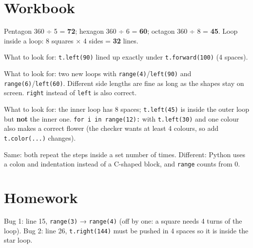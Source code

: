 
\section{Workbook}
\begin{answer}
Pentagon 360 ÷ 5 = \textbf{72}; hexagon 360 ÷ 6 = \textbf{60}; octagon 360 ÷ 8 = \textbf{45}.
Loop inside a loop: 8 squares × 4 sides = \textbf{32} lines.
\end{answer}

\begin{answer}
What to look for: \texttt{t.left(90)} lined up exactly under \texttt{t.forward(100)} (4 spaces).
\end{answer}

\begin{answer}
What to look for: two new loops with \texttt{range(4)}/\texttt{left(90)} and \texttt{range(6)}/\texttt{left(60)}. Different side lengths are fine as long as the shapes stay on screen. \texttt{right} instead of \texttt{left} is also correct.
\end{answer}

\begin{answer}
What to look for: the inner loop has 8 spaces; \texttt{t.left(45)} is inside the outer loop but \textbf{not} the inner one. \texttt{for i in range(12):} with \texttt{t.left(30)} and one colour also makes a correct flower (the checker wants at least 4 colours, so add \texttt{t.color(...)} changes).
\end{answer}

\begin{answer}[Reflection]
Same: both repeat the steps inside a set number of times. Different: Python uses a colon and indentation instead of a C-shaped block, and \texttt{range} counts from 0.
\end{answer}

\section{Homework}
\begin{answer}
Bug 1: line 15, \texttt{range(3)} → \texttt{range(4)} (off by one: a square needs 4 turns of the loop). Bug 2: line 26, \texttt{t.right(144)} must be pushed in 4 spaces so it is inside the star loop.
\end{answer}

